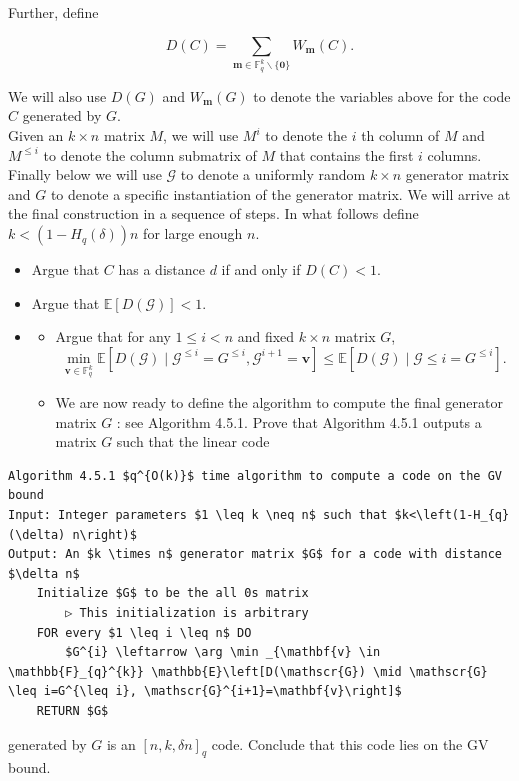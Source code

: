 \documentclass[10pt]{article}
\begin{document}
Further, define

$$
D(C)=\sum_{\mathbf{m} \in \mathbb{F}_{q}^{k} \backslash\{\mathbf{0}\}} W_{\mathbf{m}}(C) .
$$

We will also use $D(G)$ and $W_{\mathbf{m}}(G)$ to denote the variables above for the code $C$ generated by $G$.\\
Given an $k \times n$ matrix $M$, we will use $M^{i}$ to denote the $i$ th column of $M$ and $M^{\leq i}$ to denote the column submatrix of $M$ that contains the first $i$ columns. Finally below we will use $\mathscr{G}$ to denote a uniformly random $k \times n$ generator matrix and $G$ to denote a specific instantiation of the generator matrix. We will arrive at the final construction in a sequence of steps. In what follows define $k<\left(1-H_{q}(\delta)\right) n$ for large enough $n$.

\begin{itemize}
  \item[1.] Argue that $C$ has a distance $d$ if and only if $D(C)<1$.
  \item[2.] Argue that $\mathbb{E}[D(\mathscr{G})]<1$.
\end{itemize}

\begin{itemize}
  \item[]
  \begin{itemize}
    \item[3.] Argue that for any $1 \leq i<n$ and fixed $k \times n$ matrix $G$,
$$
\min _{\mathbf{v} \in \mathbb{F}_{q}^{k}} \mathbb{E}\left[D(\mathscr{G}) \mid \mathscr{G}^{\leq i}=G^{\leq i}, \mathscr{G}^{i+1}=\mathbf{v}\right] \leq \mathbb{E}\left[D(\mathscr{G}) \mid \mathscr{G} \leq i=G^{\leq i}\right] .
$$
    \item[4.] We are now ready to define the algorithm to compute the final generator matrix $G$ : see Algorithm 4.5.1. Prove that Algorithm 4.5.1 outputs a matrix $G$ such that the linear code
  \end{itemize}
\end{itemize}

\begin{lstlisting}[mathescape=true]
Algorithm 4.5.1 $q^{O(k)}$ time algorithm to compute a code on the GV bound
Input: Integer parameters $1 \leq k \neq n$ such that $k<\left(1-H_{q}(\delta) n\right)$
Output: An $k \times n$ generator matrix $G$ for a code with distance $\delta n$
    Initialize $G$ to be the all 0s matrix
        ▷ This initialization is arbitrary
    FOR every $1 \leq i \leq n$ DO
        $G^{i} \leftarrow \arg \min _{\mathbf{v} \in \mathbb{F}_{q}^{k}} \mathbb{E}\left[D(\mathscr{G}) \mid \mathscr{G} \leq i=G^{\leq i}, \mathscr{G}^{i+1}=\mathbf{v}\right]$
    RETURN $G$
\end{lstlisting}
generated by $G$ is an $[n, k, \delta n]_{q}$ code. Conclude that this code lies on the GV bound.
\end{document}
